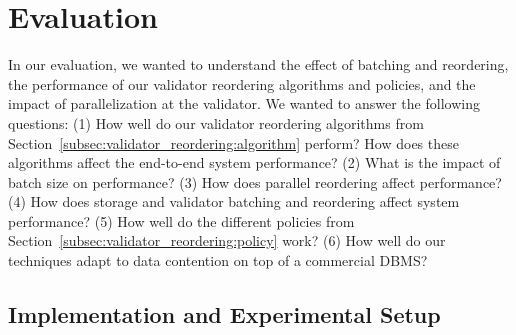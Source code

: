 \section{Evaluation}\label{sec:experiments}

In our evaluation, we wanted to understand the effect of batching and reordering, the performance of our validator reordering algorithms and policies, and the impact of parallelization at the validator.
We wanted to answer the following questions:
(1) How well do our validator reordering algorithms from Section~\ref{subsec:validator_reordering:algorithm} perform? How does these algorithms affect the end-to-end system performance?
(2) What is the impact of batch size on performance? 
(3) How does parallel reordering affect performance?
(4) How does storage and validator batching and reordering
  affect system performance?
(5) How well do the different policies from Section~\ref{subsec:validator_reordering:policy} work?
(6) How well do our techniques adapt to data contention on top of a commercial DBMS?


\subsection{Implementation and Experimental Setup}
\label{subsec:experiment:implementation}


